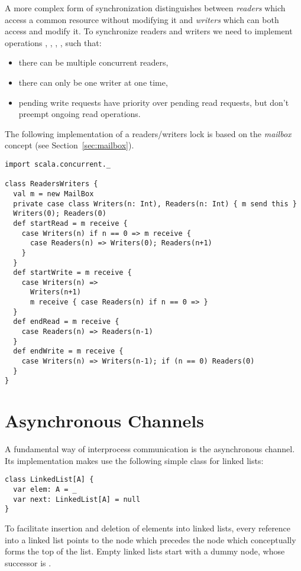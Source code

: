 {A more complex form of synchronization distinguishes between {\em
readers} which access a common resource without modifying it and {\em
writers} which can both access and modify it. To synchronize readers
and writers we need to implement operations , ,
, , such that:
\begin{itemize}
\item there can be multiple concurrent readers,
\item there can only be one writer at one time,
\item pending write requests have priority over pending read requests,
but don't preempt ongoing read operations.
\end{itemize}
The following implementation of a readers/writers lock is based on the
{\em mailbox} concept (see Section~\ref{sec:mailbox}).

\begin{lstlisting}
import scala.concurrent._

class ReadersWriters {
  val m = new MailBox
  private case class Writers(n: Int), Readers(n: Int) { m send this }
  Writers(0); Readers(0)
  def startRead = m receive {
    case Writers(n) if n == 0 => m receive {
      case Readers(n) => Writers(0); Readers(n+1)
    }
  }
  def startWrite = m receive {
    case Writers(n) =>
      Writers(n+1)
      m receive { case Readers(n) if n == 0 => }
  }
  def endRead = m receive {
    case Readers(n) => Readers(n-1)
  }
  def endWrite = m receive {
    case Writers(n) => Writers(n-1); if (n == 0) Readers(0)
  }
}
\end{lstlisting}

\section{Asynchronous Channels}

A fundamental way of interprocess communication is the asynchronous
channel. Its implementation makes use the following simple class for linked
lists:
\begin{lstlisting}
class LinkedList[A] {
  var elem: A = _
  var next: LinkedList[A] = null
}
\end{lstlisting}
To facilitate insertion and deletion of elements into linked lists,
every reference into a linked list points to the node which precedes
the node which conceptually forms the top of the list.
Empty linked lists start with a dummy node, whose successor is .

}
